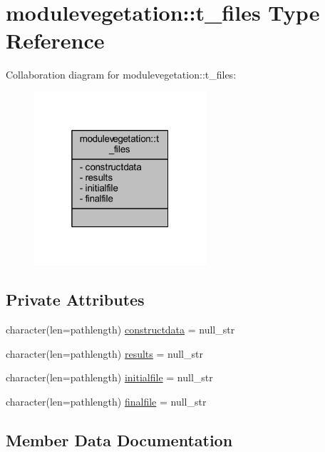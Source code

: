 \hypertarget{structmodulevegetation_1_1t__files}{}\section{modulevegetation\+:\+:t\+\_\+files Type Reference}
\label{structmodulevegetation_1_1t__files}


Collaboration diagram for modulevegetation\+:\+:t\+\_\+files\+:\nopagebreak
\begin{figure}[H]
\begin{center}
\leavevmode
\includegraphics[width=181pt]{structmodulevegetation_1_1t__files__coll__graph}
\end{center}
\end{figure}
\subsection*{Private Attributes}
\begin{DoxyCompactItemize}
\item 
character(len=pathlength) \mbox{\hyperlink{structmodulevegetation_1_1t__files_a94c4e374d870c184ce8861286fd3d9c6}{constructdata}} = null\+\_\+str
\item 
character(len=pathlength) \mbox{\hyperlink{structmodulevegetation_1_1t__files_a5c281853bb86962134ee84a289aaa09e}{results}} = null\+\_\+str
\item 
character(len=pathlength) \mbox{\hyperlink{structmodulevegetation_1_1t__files_aa3c3111fafd6cfd8fd9bbaf9c898bf02}{initialfile}} = null\+\_\+str
\item 
character(len=pathlength) \mbox{\hyperlink{structmodulevegetation_1_1t__files_aacc7faa6d5c034ef10475ed6238899b6}{finalfile}} = null\+\_\+str
\end{DoxyCompactItemize}


\subsection{Member Data Documentation}
\mbox{\label{structmodulevegetation_1_1t__files_a94c4e374d870c184ce8861286fd3d9c6}} 
